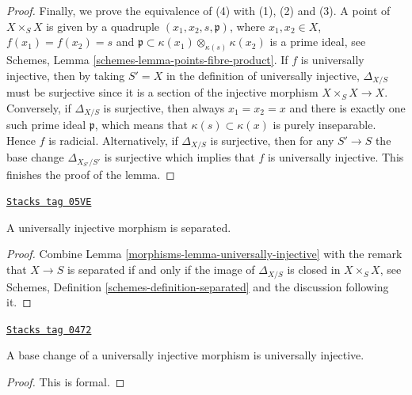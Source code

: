 \begin{proof}
\medskip\noindent
Finally, we prove the equivalence of (4) with (1), (2) and (3).
A point of $X \times_S X$ is given by a quadruple
$(x_1, x_2, s, \mathfrak p)$, where $x_1, x_2 \in X$,
$f(x_1) = f(x_2) = s$ and
$\mathfrak p \subset \kappa(x_1) \otimes_{\kappa(s)} \kappa(x_2)$
is a prime ideal, see
Schemes, Lemma \ref{schemes-lemma-points-fibre-product}.
If $f$ is universally injective, then
by taking $S'=X$ in the definition of universally injective,
$\Delta_{X/S}$ must be surjective since it is a section of
the injective morphism
$X \times_S X  \longrightarrow X$.
Conversely, if
$\Delta_{X/S}$ is surjective, then always $x_1 = x_2 = x$ and there
is exactly one such prime ideal $\mathfrak p$, which means that
$\kappa(s) \subset \kappa(x)$ is purely inseparable.
Hence $f$ is radicial.
Alternatively, if $\Delta_{X/S}$ is surjective,
then for any $S' \to S$ the base
change $\Delta_{X_{S'}/S'}$ is surjective which implies that $f$
is universally injective. This finishes the proof of the lemma.
\end{proof}

\begin{lemma}
\label{morphisms-lemma-universally-injective-separated}
\href{https://stacks.math.columbia.edu/tag/05VE}{\texttt{Stacks tag 05VE}}

A universally injective morphism is separated.
\end{lemma}

\begin{proof}

Combine
Lemma \ref{morphisms-lemma-universally-injective}
with the remark that $X \to S$ is separated if and only if the image
of $\Delta_{X/S}$ is closed in $X \times_S X$, see
Schemes, Definition \ref{schemes-definition-separated}
and the discussion following it.
\end{proof}

\begin{lemma}
\label{morphisms-lemma-base-change-universally-injective}
\href{https://stacks.math.columbia.edu/tag/0472}{\texttt{Stacks tag 0472}}

A base change of a universally injective morphism is universally injective.
\end{lemma}

\begin{proof}
This is formal.
\end{proof}

